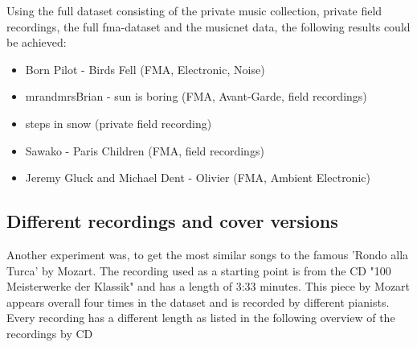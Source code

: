 Using the full dataset consisting of the private music collection, private field recordings, the full fma-dataset and the musicnet data, the following results could be achieved: 

\begin{itemize}
	\setlength\itemsep{0em}
	\item Born Pilot - Birds Fell (FMA, Electronic, Noise)
	\item mrandmrsBrian - sun is boring (FMA, Avant-Garde, field recordings)
	\item steps in snow (private field recording)
	\item Sawako - Paris Children (FMA, field recordings)
	\item Jeremy Gluck and Michael Dent - Olivier (FMA, Ambient Electronic)
	
\end{itemize}

\subsection{Different recordings and cover versions}
Another experiment was, to get the most similar songs to the famous 'Rondo alla Turca' by Mozart.
The recording used as a starting point is from the CD "100 Meisterwerke der Klassik" and has a length of 3:33 minutes.
This piece by Mozart appears overall four times in the dataset and is recorded by different pianists.
Every recording has a different length as listed in the following overview of the recordings by CD

